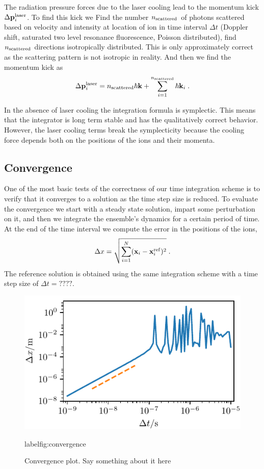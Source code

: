 \documentclass[aps, pra, preprint]{revtex4-1}
\begin{document}
The radiation pressure forces due to the laser cooling lead to
the momentum kick $\Delta \mathbf{p}_i^{\rm laser}$. To find this
kick we Find the number $n_{\rm scattered}$ of photons scattered
based on velocity and intensity at location of ion in time
interval $\Delta t$ (Doppler shift, saturated two level resonance
fluorescence, Poisson distributed), find $n_{\rm scattered}$ directions isotropically
distributed. This is only approximately correct as the scattering
pattern is not isotropic in reality. And then we find the
momentum kick as
\begin{equation}
\Delta \mathbf{p}_i^{\rm laser} = n_{\rm scattered}\hbar
\mathbf{k} + \sum_{i=1}^{n_{\rm scattered}} \hbar \mathbf{k}_i\;.
\end{equation}

In the absence of laser cooling the integration formula is
symplectic. This means that the integrator is long term stable
and has the qualitatively correct behavior. However, the laser
cooling terms break the symplecticity because the cooling force
depends both on the positions of the ions and their momenta.


\subsection{Convergence}

One of the most basic tests of the correctness of our time
integration scheme is to verify that it converges to a solution
as the time step size is reduced. To evaluate the convergence we
start with a steady state solution, impart some perturbation on
it, and then we integrate the ensemble's dynamics for a certain
period of time. At the end of the time interval we compute the
error in the positions of the ions,
\begin{equation}
  \Delta x = \sqrt{\sum_{i=1}^N(\mathbf{x}_i-\mathbf{x}_i^{\rm ref})^2}\;.
\end{equation}
The reference solution is obtained using the same integration
scheme with a time step size of $\Delta t=????$.
\begin{figure}
  \includegraphics{./figures/fig_convergence.pdf}
  \caption{Convergence plot. Say something about it here}
  label{fig:convergence}
\end{figure}
\end{document}
